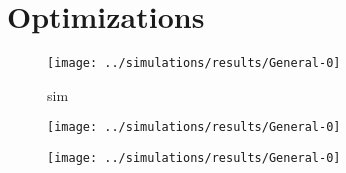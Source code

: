 \documentclass[]{scrartcl}
\begin{document}
\section{Optimizations}

\begin{figure}[ht]
    \centering
    \texttt{[image: ../simulations/results/General-0]}
    \caption{sim}%
    \label{fig:optsim_inport_qlen}
\end{figure}
\begin{figure}[ht]
    \centering
    \texttt{[image: ../simulations/results/General-0]}
    \caption{}%
    \label{fig:}
\end{figure}
\begin{figure}[ht]
    \centering
    \texttt{[image: ../simulations/results/General-0]}
    \caption{}%
    \label{fig:}
\end{figure}
\end{document}
